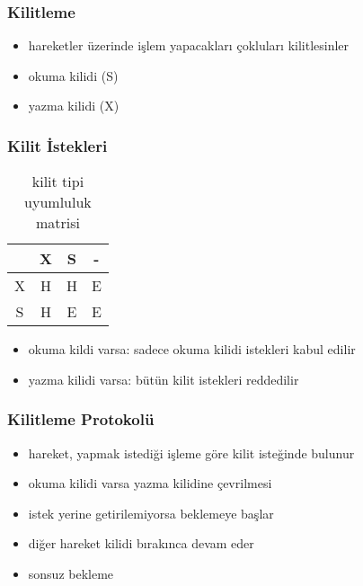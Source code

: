 \documentclass[dvipsnames]{beamer}
\theoremstyle{plain}
\begin{document}
\begin{frame}
  \frametitle{Kilitleme}

  \begin{itemize}
    \item hareketler üzerinde işlem yapacakları çokluları kilitlesinler

    \medskip
    \item \alert{okuma} kilidi (S)
    \item \alert{yazma} kilidi (X)
  \end{itemize}
\end{frame}

%
%
%
\begin{frame}
  \frametitle{Kilit İstekleri}

    \begin{table}
      \caption{kilit tipi uyumluluk matrisi}
      \begin{tabular}{|c||c|c|c|}\hline
  & X & S & -\\\hline\hline
X & H & H & E\\\hline
S & H & E & E\\\hline
      \end{tabular}
    \end{table}
    
     \medskip
  \begin{itemize}
    \item okuma kildi varsa: sadece okuma kilidi istekleri kabul edilir
    \item yazma kilidi varsa: bütün kilit istekleri reddedilir
  \end{itemize}
\end{frame}

\begin{frame}
  \frametitle{Kilitleme Protokolü}

  \begin{itemize}
    \item hareket, yapmak istediği işleme göre kilit isteğinde bulunur
    \item okuma kilidi varsa yazma kilidine çevrilmesi

    \medskip
    \item istek yerine getirilemiyorsa beklemeye başlar
    \item diğer hareket kilidi bırakınca devam eder
    
    \medskip
    \item \alert{sonsuz bekleme}
  \end{itemize}
\end{frame}
\end{document}
